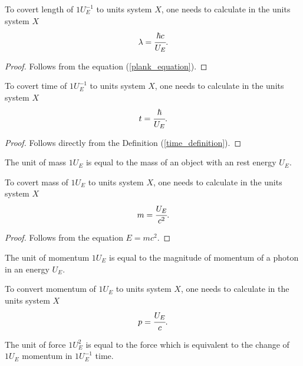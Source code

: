 \documentclass[main.tex]{subfiles}
\begin{document}
\begin{proposition}
To covert length of $1 U_E^{-1}$ to units system $X$, one needs to calculate in the units system $X$
\begin{equation}
\lambda = \cfrac{\hbar c}{U_E}.
\end{equation}
\end{proposition}
\begin{proof}
Follows from the equation (\ref{plank_equation}).
\end{proof}
\begin{proposition}
\label{time_recalculation}
To covert time of $1 U_E^{-1}$ to units system $X$, one needs to calculate in the units system $X$
\begin{equation}
t = \cfrac{\hbar}{U_E}.
\end{equation}
\end{proposition}
\begin{proof}
Follows directly from the Definition (\ref{time_definition}).
\end{proof}
\begin{definition}
The unit of mass $1U_E$ is equal to the mass of an object with an rest energy $U_E$.
\end{definition}
\begin{proposition}
To covert mass of $1 U_E$ to units system $X$, one needs to calculate in the units system $X$
\begin{equation}
m = \cfrac{U_E}{c^2}.
\end{equation}
\end{proposition}
\begin{proof}
Follows from the equation $E = mc^2$.
\end{proof}
\begin{definition}
\label{momentum_definition}
The unit of momentum $1U_E$ is equal to the magnitude of momentum of a photon in an energy $U_E$.
\end{definition}
\begin{proposition}
\label{momentum_recalculation}
To convert momentum of $1 U_E$ to units system $X$, one needs to calculate in the units system $X$
\begin{equation}
p = \cfrac{U_E}{c}.
\end{equation}
\end{proposition}
\begin{definition}
The unit of force $1U_E^2$ is equal to the force which is equivalent to the change of $1 U_E$ momentum in $1U_E^{-1}$ time.
\end{definition}
\end{document}
